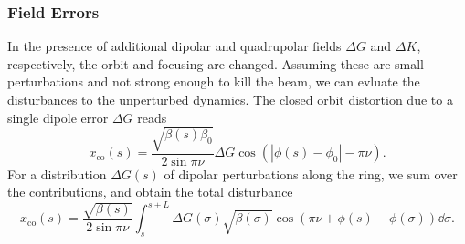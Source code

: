 \subsubsection{Field Errors}

    In the presence of additional dipolar and quadrupolar fields $\Delta G$ and $\Delta K$, respectively, the orbit and focusing are changed. Assuming these are small perturbations and not strong enough to kill the beam, we can evluate the disturbances to the unperturbed dynamics.
    The closed orbit distortion due to a single dipole error $\Delta G$ reads
    \begin{equation}
        x_{\text{co}}(s) = \frac{\sqrt{\beta(s)\beta_0}}{2\sin\pi\nu}\Delta G\cos(|\phi(s)-\phi_0| - \pi\nu).
        \label{eq:cod}
    \end{equation}
    For a distribution $\Delta G(s)$ of dipolar perturbations along the ring, we sum over the contributions, and obtain the total disturbance
    \begin{equation}
        x_{\text{co}}(s) = \frac{\sqrt{\beta(s)}}{2\sin\pi\nu}\int_{s}^{s+L} \Delta G(\sigma)\sqrt{\beta(\sigma)}\cos(\pi\nu + \phi(s) - \phi(\sigma))\dd \sigma.
        \label{eq:cod_dist}
    \end{equation}

